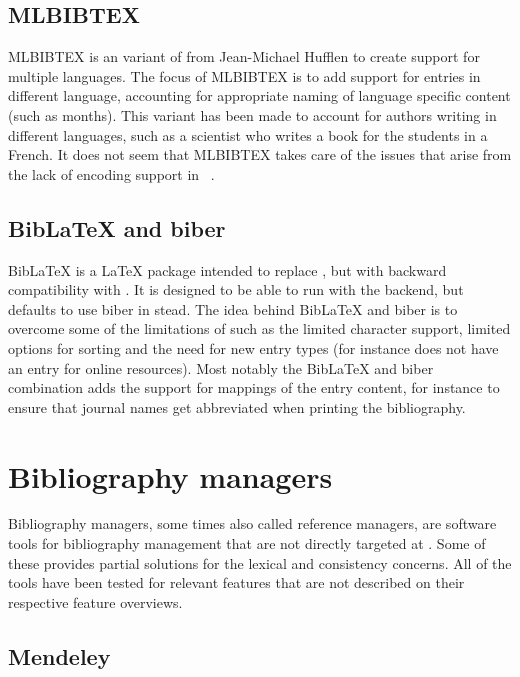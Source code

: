 \subsection{MLBIBTEX}
MLBIBTEX is an variant of {\bibtex} from Jean-Michael Hufflen to
create support for multiple languages.  The focus of MLBIBTEX is to
add support for entries in different language, accounting for
appropriate naming of language specific content (such as months).
This variant has been made to account for authors writing in different
languages, such as a scientist who writes a book for the students in a
French.  It does not seem that MLBIBTEX takes care of the issues that
arise from the lack of encoding support in
{\bibtex}~\cite{hufflen2001_mlbibtex}.


\subsection{Bib{\LaTeX} and biber}
\label{sec:related_biblatex}

Bib{\LaTeX} is a {\LaTeX} package intended to replace {\bibtex}, but
with backward compatibility with {\bibtex}.  It is designed to be able
to run with the {\bibtex} backend, but defaults to use biber in stead.
The idea behind Bib{\LaTeX} and biber is to overcome some of the
limitations of {\bibtex} such as the limited character support,
limited options for sorting and the need for new entry types (for
instance {\bibtex} does not have an entry for online resources).  Most
notably the Bib{\LaTeX} and biber combination adds the support for
mappings of the entry content, for instance to ensure that journal
names get abbreviated when printing the bibliography.


\section{Bibliography managers}
\label{sec:bibliography_managers}

Bibliography managers, some times also called reference managers, are
software tools for bibliography management that are not directly
targeted at {\bibtex}.  Some of these provides partial solutions for
the lexical and consistency concerns.  All of the tools have been
tested for relevant features that are not described on their
respective feature overviews.

\subsection{Mendeley}
\label{sec:related_mendeley}

